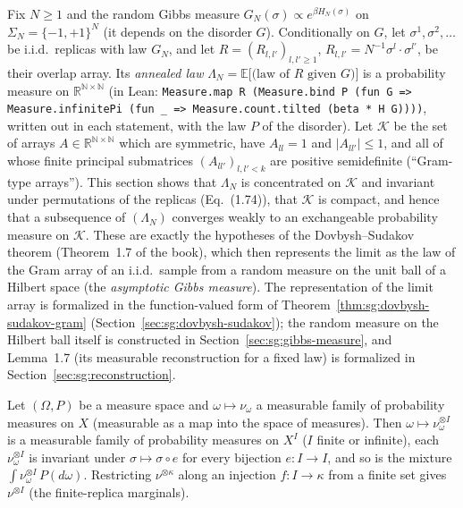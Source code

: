 Fix $N\ge1$ and the random Gibbs measure $G_N(\sigma)\propto e^{\beta H_N(\sigma)}$ on $\Sigma_N=\{-1,+1\}^N$ (it depends on the disorder $G$). Conditionally on $G$, let
$\sigma^1,\sigma^2,\dots$ be i.i.d.\ replicas with law $G_N$, and let $R=(R_{l,l'})_{l,l'\ge1}$, $R_{l,l'}=N^{-1}\sigma^l\cdot\sigma^{l'}$, be their overlap array. Its
\emph{annealed law} $\Lambda_N=\mathbb E\big[\big(\text{law of }R\text{ given }G\big)\big]$ is a probability measure on $\mathbb R^{\mathbb N\times\mathbb N}$ (in Lean:
\texttt{Measure.map R (Measure.bind P (fun G => Measure.infinitePi (fun \_ => Measure.count.tilted (beta * H G))))}, written out in each statement, with the
law $P$ of the disorder). Let $\mathcal K$ be the set of arrays $A\in\mathbb R^{\mathbb N\times\mathbb N}$ which are symmetric, have $A_{ll}=1$ and $|A_{ll'}|\le1$, and all of whose finite
principal submatrices $(A_{ll'})_{l,l'<k}$ are positive semidefinite (``Gram-type arrays''). This section shows that $\Lambda_N$ is concentrated on $\mathcal K$ and
invariant under permutations of the replicas (Eq.~(1.74)), that $\mathcal K$ is compact, and hence that a subsequence of $(\Lambda_N)$ converges weakly to an exchangeable
probability measure on $\mathcal K$. These are exactly the hypotheses of the Dovbysh--Sudakov theorem (Theorem~1.7 of the book), which then represents the limit as the law of the Gram
array of an i.i.d.\ sample from a random measure on the unit ball of a Hilbert space (the \emph{asymptotic Gibbs measure}). The representation of the limit array is formalized in the function-valued form of Theorem~\ref{thm:sg:dovbysh-sudakov-gram} (Section~\ref{sec:sg:dovbysh-sudakov}); the random measure on the Hilbert ball itself is constructed in Section~\ref{sec:sg:gibbs-measure}, and Lemma~1.7 (its measurable reconstruction for a fixed law) is formalized in Section~\ref{sec:sg:reconstruction}.

\begin{lemma}\label{lem:sg:mixture}
  \leanok
Let $(\Omega,P)$ be a measure space and $\omega\mapsto\nu_\omega$ a measurable family of probability measures on $X$ (measurable as a map into the space of measures). Then
$\omega\mapsto\nu_\omega^{\otimes I}$ is a measurable family of probability measures on $X^I$ ($I$ finite or infinite), each $\nu_\omega^{\otimes I}$ is invariant under
$\sigma\mapsto\sigma\circ e$ for every bijection $e:I\to I$, and so is the mixture $\int\nu_\omega^{\otimes I}\,P(d\omega)$.
Restricting $\nu^{\otimes\kappa}$ along an injection $f:I\to\kappa$ from a finite set gives $\nu^{\otimes I}$ (the finite-replica marginals).
\end{lemma}

